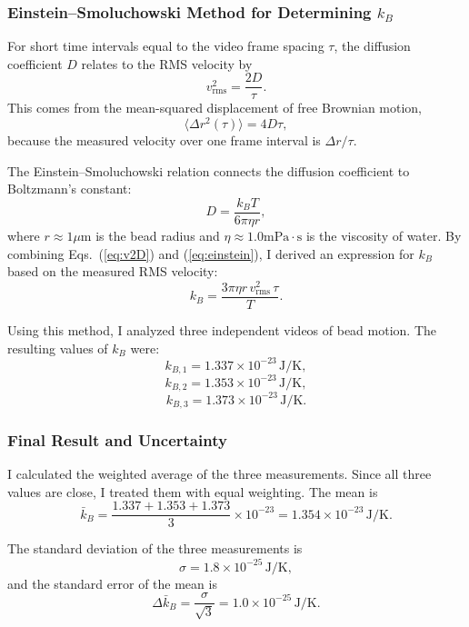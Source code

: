 \documentclass[%
 reprint,
 amsmath,amssymb,
 aps,
]{revtex4-2}
\begin{document}
\subsubsection*{Einstein–Smoluchowski Method for Determining $k_B$}

For short time intervals equal to the video frame spacing $\tau$, the diffusion coefficient $D$ relates to the RMS velocity by
\begin{equation}
    v_{\mathrm{rms}}^2 = \frac{2D}{\tau}.
    \label{eq:v2D}
\end{equation}
This comes from the mean-squared displacement of free Brownian motion,
\[
    \langle \Delta r^2(\tau) \rangle = 4D\tau,
\]
because the measured velocity over one frame interval is $\Delta r / \tau$.

The Einstein–Smoluchowski relation connects the diffusion coefficient to Boltzmann’s constant:
\begin{equation}
    D = \frac{k_B T}{6 \pi \eta r},
    \label{eq:einstein}
\end{equation}
where $r\approx 1\mu\text{m}$ is the bead radius and $\eta\approx 1.0 \text{mPa}\cdot \text{s}$ is the viscosity of water. By combining Eqs.~(\ref{eq:v2D}) and (\ref{eq:einstein}), I derived an expression for $k_B$ based on the measured RMS velocity:
\begin{equation}
    k_B =
    \frac{3\pi\eta r\, v_{\mathrm{rms}}^2\, \tau}{T}.
    \label{eq:kB_from_vrms}
\end{equation}

Using this method, I analyzed three independent videos of bead motion. The resulting values of $k_B$ were:
\[
    k_{B,1} = 1.337\times10^{-23}\,\mathrm{J/K},
\]
\[
    k_{B,2} = 1.353\times10^{-23}\,\mathrm{J/K},
\]
\[
    k_{B,3} = 1.373\times10^{-23}\,\mathrm{J/K}.
\]

\subsubsection*{Final Result and Uncertainty}

I calculated the weighted average of the three measurements. Since all three values are close, I treated them with equal weighting. The mean is
\[
    \bar{k}_B =
    \frac{1.337 + 1.353 + 1.373}{3}\times10^{-23}
    = 1.354\times10^{-23}\,\mathrm{J/K}.
\]

The standard deviation of the three measurements is
\[
    \sigma =
    1.8\times10^{-25}\,\mathrm{J/K},
\]
and the standard error of the mean is
\[
    \Delta\bar{k}_B = \frac{\sigma}{\sqrt{3}}
    = 1.0\times10^{-25}\,\mathrm{J/K}.
\]
\end{document}

